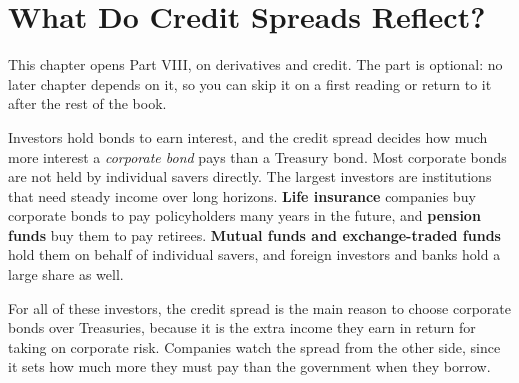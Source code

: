 \makeatletter
{}
\makeatother

\makeatletter
\makeatother

\chapter{What Do Credit Spreads Reflect?}
\label{ch:17}
\providecommand{\term}[1]{\emph{#1}}

This chapter opens Part VIII, on derivatives and credit. The part is optional: no later chapter depends on it, so you can skip it on a first reading or return to it after the rest of the book.

Investors hold bonds to earn interest, and the credit spread decides how much more interest a \term{corporate bond} pays than a Treasury bond. Most corporate bonds are not held by individual savers directly. The largest investors are institutions that need steady income over long horizons. \textbf{Life insurance} companies buy corporate bonds to pay policyholders many years in the future, and \textbf{pension funds} buy them to pay retirees. \textbf{Mutual funds and exchange-traded funds} hold them on behalf of individual savers, and foreign investors and banks hold a large share as well.

For all of these investors, the credit spread is the main reason to choose corporate bonds over Treasuries, because it is the extra income they earn in return for taking on corporate risk. Companies watch the spread from the other side, since it sets how much more they must pay than the government when they borrow.


